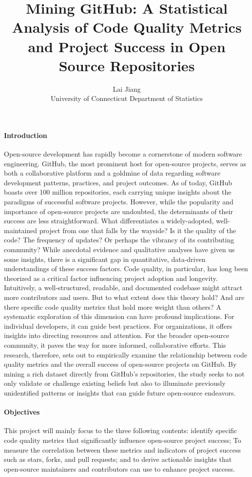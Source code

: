 \documentclass[12pt]{article}
\title{Mining GitHub: A Statistical Analysis of Code Quality Metrics and Project Success in Open Source Repositories}
\author{Lai Jiang\\
  University of Connecticut Department of Statistics
}
\begin{document}
\maketitle

\paragraph{Introduction}
Open-source development has rapidly become a cornerstone of modern software engineering. GitHub, the most prominent host for open-source projects, serves as both a collaborative platform and a goldmine of data regarding software development patterns, practices, and project outcomes. As of today, GitHub boasts over 100 million repositories, each carrying unique insights about the paradigms of successful software projects. However, while the popularity and importance of open-source projects are undoubted, the determinants of their success are less straightforward. What differentiates a widely-adopted, well-maintained project from one that falls by the wayside? Is it the quality of the code? The frequency of updates? Or perhaps the vibrancy of its contributing community? While anecdotal evidence and qualitative analyses have given us some insights, there is a significant gap in quantitative, data-driven understandings of these success factors. Code quality, in particular, has long been theorized as a critical factor influencing project adoption and longevity. Intuitively, a well-structured, readable, and documented codebase might attract more contributors and users. But to what extent does this theory hold? And are there specific code quality metrics that hold more weight than others? A systematic exploration of this dimension can have profound implications. For individual developers, it can guide best practices. For organizations, it offers insights into directing resources and attention. For the broader open-source community, it paves the way for more informed, collaborative efforts. This research, therefore, sets out to empirically examine the relationship between code quality metrics and the overall success of open-source projects on GitHub. By mining a rich dataset directly from GitHub's repositories, the study seeks to not only validate or challenge existing beliefs but also to illuminate previously unidentified patterns or insights that can guide future open-source endeavors.

\paragraph{Objectives}
This project will mainly focus to the three following contents: identify specific code quality metrics that significantly influence open-source project success; To measure the correlation between these metrics and indicators of project success such as stars, forks, and pull requests; and to derive actionable insights that open-source maintainers and contributors can use to enhance project success.
\end{document}
